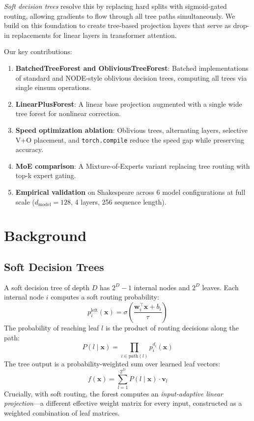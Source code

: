 \documentclass[11pt,a4paper]{article}
\begin{document}
\textit{Soft decision trees} \citep{irsoy2012soft,frosst2017distilling} resolve this by replacing hard splits with sigmoid-gated routing, allowing gradients to flow through all tree paths simultaneously. We build on this foundation to create tree-based projection layers that serve as drop-in replacements for linear layers in transformer attention.

Our key contributions:
\begin{enumerate}
    \item \textbf{BatchedTreeForest and ObliviousTreeForest}: Batched implementations of standard and NODE-style oblivious decision trees, computing all trees via single einsum operations.
    \item \textbf{LinearPlusForest}: A linear base projection augmented with a single wide tree forest for nonlinear correction.
    \item \textbf{Speed optimization ablation}: Oblivious trees, alternating layers, selective V+O placement, and \texttt{torch.compile} reduce the speed gap while preserving accuracy.
    \item \textbf{MoE comparison}: A Mixture-of-Experts variant replacing tree routing with top-k expert gating.
    \item \textbf{Empirical validation} on Shakespeare across 6 model configurations at full scale ($d_{\text{model}}=128$, 4 layers, 256 sequence length).
\end{enumerate}

\section{Background}

\subsection{Soft Decision Trees}

A soft decision tree of depth $D$ has $2^D - 1$ internal nodes and $2^D$ leaves. Each internal node $i$ computes a soft routing probability:
\begin{equation}
    p_i^{\text{left}}(\mathbf{x}) = \sigma\!\left(\frac{\mathbf{w}_i^\top \mathbf{x} + b_i}{\tau}\right)
\end{equation}
The probability of reaching leaf $l$ is the product of routing decisions along the path:
\begin{equation}
    P(l \mid \mathbf{x}) = \prod_{i \in \text{path}(l)} p_i^{d_i}(\mathbf{x})
\end{equation}
The tree output is a probability-weighted sum over learned leaf vectors:
\begin{equation}
    f(\mathbf{x}) = \sum_{l=1}^{2^D} P(l \mid \mathbf{x}) \cdot \mathbf{v}_l
\end{equation}
Crucially, with soft routing, the forest computes an \textit{input-adaptive linear projection}---a different effective weight matrix for every input, constructed as a weighted combination of leaf matrices.
\end{document}
